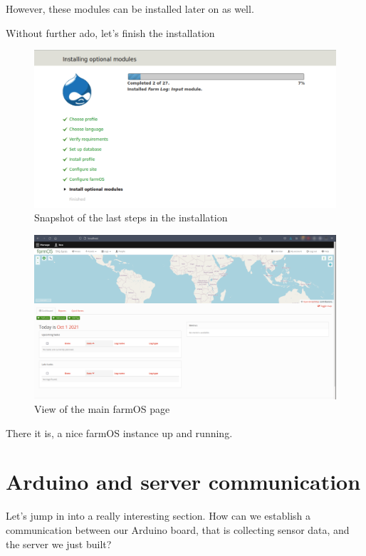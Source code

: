 However, these modules can be installed later on as well.

Without further ado, let's finish the installation

\begin{figure}[H]
    \centering
    \includegraphics[width=1\textwidth]{fig/drupal-install/completing-install.png}
    \caption{Snapshot of the last steps in the installation}
    \label{fig:completing-install}
\end{figure}


\begin{figure}[H]
    \centering
    \includegraphics[width=1\textwidth]{fig/drupal-install/farmos-main-page.png}
    \caption{View of the main farmOS page}
    \label{fig:farmos-main-page}
\end{figure}

There it is, a nice farmOS instance up and running.


\vspace{7mm}
\section{Arduino and server communication}
Let's jump in into a really interesting section. How can we establish a communication between our Arduino board, that is collecting sensor data, and the server we just built?

